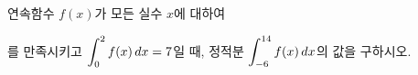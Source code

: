 연속함수 $f(x)$가 모든 실수 $x$에 대하여\par\smallskip{}\par\smallskip\noindent 를 만족시키고 $\displaystyle\int_{0}^{2} f(x)\mkern3mu dx=7$일 때, 정적분 $\displaystyle\int_{-6}^{14} f(x)\mkern3mu dx$의 값을 구하시오.
